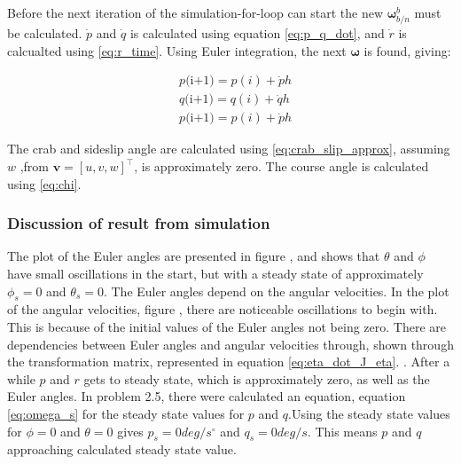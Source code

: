 Before the next iteration of the simulation-for-loop can start the new $\boldsymbol{\omega}^b_{b/n}$ must be calculated. $\dot{p}$ and $\dot{q}$ is calculated using equation \eqref{eq:p_q_dot}, and $\dot{r}$ is calcualted using \eqref{eq:r_time}. Using Euler integration, the next $\boldsymbol{\omega}$ is found, giving:

\begin{equation}
\begin{aligned}
	& p\text{(i+1)} = p(i) + \dot{p} h \\
	& q\text{(i+1)} = q(i) + \dot{q} h \\
	& p \text{(i+1)} = p(i) + \dot{p} h
\end{aligned}
\end{equation}

The crab and sideslip angle are calculated using \eqref{eq:crab_slip_approx}, assuming  $w$ ,from $\mathbf{v} =[u,v,w]^\top$, is approximately zero. The course angle is calculated using \eqref{eq:chi}.


\subsubsection*{Discussion of result from simulation}

The plot of the Euler angles are presented in figure , and shows that $\theta$ and $\phi$ have small oscillations in the start, but with a steady state of approximately $\phi_s = 0$ and $\theta_s = 0$. The Euler angles depend on the angular velocities. In the plot of the angular velocities, figure , there are noticeable oscillations to begin with. This is because of the initial values of the Euler angles not being zero. There are dependencies between Euler angles and angular velocities through, shown through the transformation matrix, represented in equation \eqref{eq:eta_dot_J_eta}.  . After a while $p$ and $r$ gets to steady state, which is approximately zero, as well as the Euler angles. In problem 2.5, there were calculated an equation, equation \eqref{eq:omega_s} for the   steady state values for $p$ and $q$.Using the steady state values for $\phi = 0$ and $\theta = 0$ gives $p_s = 0 deg/s^\circ$ and  $q_s = 0 deg/s$. This means $p$ and $q$ approaching calculated   steady state value.  

